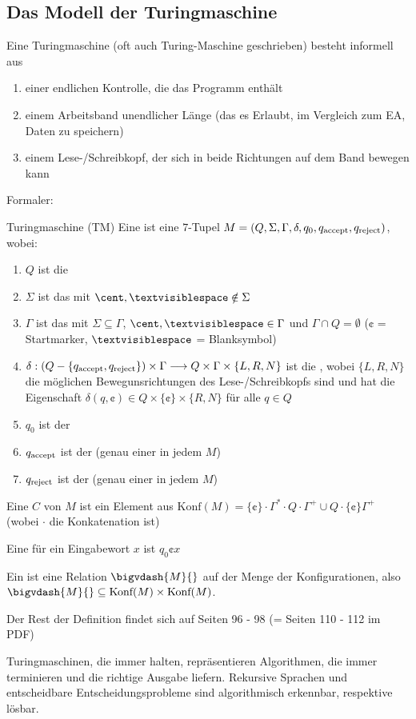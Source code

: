 \subsection{Das Modell der Turingmaschine}
Eine Turingmaschine (oft auch Turing-Maschine geschrieben) besteht informell aus
\begin{enumerate}[label=(\roman*)]
    \item einer endlichen Kontrolle, die das Programm enthält
    \item einem Arbeitsband unendlicher Länge (das es Erlaubt, im Vergleich zum EA, Daten zu speichern)
    \item einem Lese-/Schreibkopf, der sich in beide Richtungen auf dem Band bewegen kann
\end{enumerate}
Formaler:
\begin{definition}[]{Turingmaschine (TM)}
    Eine  ist eine $7$-Tupel $M = (Q, \Sigma, \Gamma, \delta, q_0, q_{\text{accept}}, q_{\text{reject}})$, wobei:
    \begin{enumerate}[label=(\roman*)]
        \item $Q$ ist die 
        \item $\Sigma$ ist das  mit $\cent, \textvisiblespace \notin \Sigma$
        \item $\Gamma$ ist das  mit $\Sigma \subseteq \Gamma$, $\cent, \textvisiblespace \in \Gamma$ und $\Gamma \cap Q = \emptyset$
              ($\cent$ = Startmarker, $\textvisiblespace$ = Blanksymbol)
        \item $\delta : (Q - \{ q_{\text{accept}}, q_{\text{reject}} \}) \times \Gamma \longrightarrow Q \times \Gamma \times \{ L, R, N \}$ ist die ,
              wobei $\{ L, R, N \}$ die möglichen Bewegunsrichtungen des Lese-/Schreibkopfs sind
              und hat die Eigenschaft $\delta(q, \cent) \in Q \times \{ \cent \} \times \{ R, N \}$ für alle $q \in Q$
        \item $q_0$ ist der 
        \item $q_{\text{accept}}$ ist der  (genau einer in jedem $M$)
        \item $q_{\text{reject}}$ ist der  (genau einer in jedem $M$)
    \end{enumerate}
    Eine  $C$ von $M$ ist ein Element aus $\text{Konf}(M) = \{ \cent \} \cdot \Gamma^* \cdot Q \cdot \Gamma^+ \cup Q \cdot \{ \cent \} \Gamma^+$
    (wobei $\cdot$ die Konkatenation ist)

    Eine  für ein Eingabewort $x$ ist $q_0\cent x$

    Ein  ist eine Relation $\bigvdash{M}{}$ auf der Menge der Konfigurationen, also $\bigvdash{M}{} \subseteq \text{Konf}(M) \times \text{Konf}(M)$.

    Der Rest der Definition findet sich auf Seiten 96 - 98 (= Seiten 110 - 112 im PDF)
\end{definition}
Turingmaschinen, die immer halten, repräsentieren Algorithmen, die immer terminieren und die richtige Ausgabe liefern.
Rekursive Sprachen und entscheidbare Entscheidungsprobleme sind algorithmisch erkennbar, respektive lösbar.

